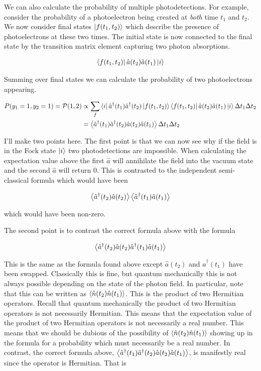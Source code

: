 \documentclass[12pt]{article}
\begin{document}
We can also calculate the probability of multiple photodetections. For example, consider the probability of a photoelectron being created at \textit{both} time $t_1$ and $t_2$. We now consider final states $\ket{f(t_1,t_2)}$ which describe the presence of photoelectrons at these two times. The initial state is now connected to the final state by the transition matrix element capturing two photon absorptions.

\begin{align}
\bra{f(t_1,t_2)}\hat{a}(t_2)\hat{a}(t_1)\ket{i}
\end{align}

Summing over final states we can calculate the probability of two photoelectrons appearing.

\begin{align}
P(y_1=1,y_2=1) = \mathcal{P}(1,2) &\propto \sum_{f}\bra{i}\hat{a}^{\dag}(t_1)\hat{a}^{\dag}(t_2)\ket{f(t_1,t_2)}\bra{f(t_1,t_2)}\hat{a}(t_2)\hat{a}(t_1)\ket{i}\Delta t_1 \Delta t_2\\
&= \Braket{\hat{a}^{\dag}(t_1)\hat{a}^{\dag}(t_2)\hat{a}(t_2)\hat{a}(t_1)}\Delta t_1 \Delta t_2
\end{align}

I'll make two points here. The first point is that we can now see why if the field is in the Fock state $\ket{i}$ two photodetections are impossible. When calculating the expectation value above the first $\hat{a}$ will annihilate the field into the vacuum state and the second $\hat{a}$ will return 0. This is contrasted to the independent semi-classical formula which would have been

\begin{align}
\Braket{\hat{a}^{\dag}(t_2) \hat{a}(t_2)} \Braket{\hat{a}^{\dag}(t_1) \hat{a}(t_1)}
\end{align}

which would have been non-zero. 

The second point is to contrast the correct formula above with the formula

\begin{align}
\Braket{\hat{a}^{\dag}(t_2)\hat{a}(t_2) \hat{a}^{\dag}(t_1)\hat{a}(t_1)}
\end{align}

This is the same as the formula found above except $\hat{a}(t_2)$ and $\hat{a}^{\dag}(t_1)$ have been swapped. Classically this is fine, but quantum mechanically this is not always possible depending on the state of the photon field. 
In particular, note that this can be written as $\Braket{\hat{n}(t_2)\hat{n}(t_1)}$. This is the product of two Hermitian operators. Recall that quantum mechanically the product of two Hermitian operators is not necessarily Hermitian. This means that the expectation value of the product of two Hermitian operators is not necessarily a real number. This means that we should be dubious of the possibility of $\Braket{\hat{n}(t_2)\hat{n}(t_1)}$ showing up in the formula for a probability which must necessarily be a real number. In contrast, the correct formula above, $\Braket{\hat{a}^{\dag}(t_1)\hat{a}^{\dag}(t_2)\hat{a}(t_2)\hat{a}(t_1)}$, is manifestly real since the operator is Hermitian. That is 
\end{document}
